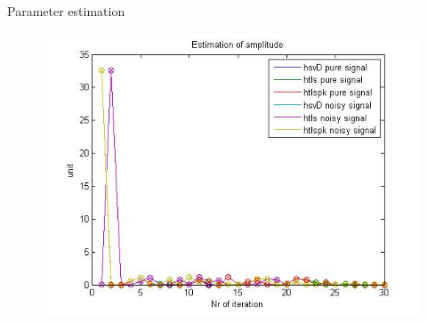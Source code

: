 \documentclass[t,12pt,english
\ifx\beamermode\undefined\else,\beamermode\fi
]{beamer}
\begin{document}
\begin{frame}{Parameter estimation}


\begin{figure}[!htbp]
%
\centering
\includegraphics[width=.8\textwidth]{12.jpg}


\end{figure}
\end{frame}
\end{document}
